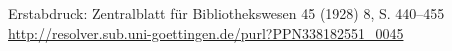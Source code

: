 Erstabdruck: Zentralblatt für Bibliothekswesen 45 (1928) 8, S. 440--455\\
\href{http://resolver.sub.uni-goettingen.de/purl?PPN338182551\_0045}{http://resolver.sub.uni-goettingen.de/purl?PPN338182551\_0045}
